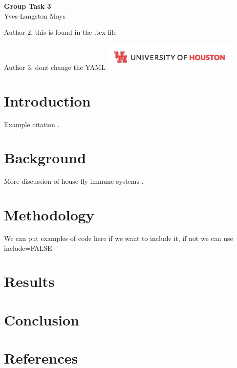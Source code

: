 \documentclass{report}
\begin{document}
\begin{titlepage}
    \centering
    \vspace*{5cm}
    {\Huge \textbf{Group Task 3}} \\[1.5em]
        
    
        Yves-Langston Mays
        
    
        Author 2, this is found in the .tex file
        
    
        Author 3, dont change the YAML
        \vfill
    \includegraphics[width=0.5\textwidth]{UHLogo_Long.png}
    \vspace{0.8cm}
\end{titlepage}

\section{Introduction}\label{introduction}

Example citation \autocite{asgari2022}.

\newpage

\section{Background}\label{background}

More discussion of house fly immune systems \autocite{asgari2022}.

\newpage

\section{Methodology}\label{methodology}

We can put examples of code here if we want to include it, if not we can
use include=FALSE

\newpage

\section{Results}\label{results}

\newpage

\section{Conclusion}\label{conclusion}

\newpage

\section*{References}\label{references}

\printbibliography[heading=none]
\end{document}
